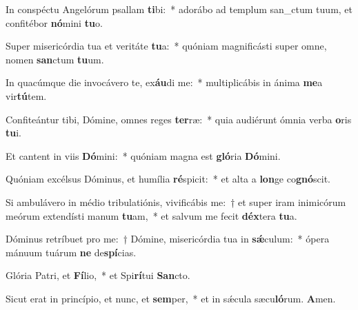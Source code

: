 \item In conspéctu Angelórum psallam \textbf{ti}bi:~* adorábo ad templum san\_ctum tuum, et confitébor \textbf{nó}mini \textbf{tu}o.
\item Super misericórdia tua et veritáte \textbf{tu}a:~* quóniam magnificásti super o\-mne, nomen \textbf{san}ctum \textbf{tu}um.
\item In quacúmque die invocávero te, ex\textbf{áu}di me:~* multiplicábis in ánima \textbf{me}a vir\textbf{tú}tem.
\item Confiteántur tibi, Dómine, omnes reges \textbf{ter}ræ:~* quia audiérunt ó\-mnia verba \textbf{o}ris \textbf{tu}i.
\item Et cantent in viis \textbf{Dó}mini:~* quóniam magna est \textbf{gló}ria \textbf{Dó}mini.
\item Quóniam excélsus Dóminus, et humília \textbf{ré}spicit:~* et alta a \textbf{lon}ge co\textbf{gnó}scit.
\item Si ambulávero in médio tribulatiónis, vivificábis me:~† et super iram inimicórum meórum extendísti manum \textbf{tu}am,~* et salvum me fecit \textbf{déx}tera \textbf{tu}a.
\item Dóminus retríbuet pro me:~† Dómine, misericórdia tua in \textbf{sǽ}culum:~* ópera mánuum tuárum \textbf{ne} de\textbf{spí}cias.
\item Glória Patri, et \textbf{Fí}lio,~* et Spi\textbf{rí}tui \textbf{San}cto.
\item Sicut erat in princípio, et nunc, et \textbf{sem}per,~* et in sǽcula sæcu\textbf{ló}rum. \textbf{A}men.
